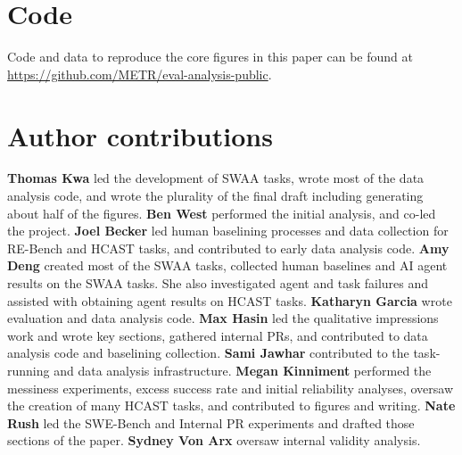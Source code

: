 \documentclass{article}
\newcommand{\gabenchmark}{HCAST}
\begin{document}


\section{Code}

Code and data to reproduce the core figures in this paper can be found at \url{https://github.com/METR/eval-analysis-public}.

\section{Author contributions}


\textbf{Thomas Kwa} led the development of SWAA tasks, wrote most of the data analysis code, and wrote the plurality of the final draft including generating about half of the figures.  \textbf{Ben West} performed the initial analysis, and co-led the project. \textbf{Joel Becker} led human baselining processes and data collection for RE-Bench and \gabenchmark{} tasks, and contributed to early data analysis code. \textbf{Amy Deng} created most of the SWAA tasks, collected human baselines and AI agent results on the SWAA tasks. She also investigated agent and task failures and assisted with obtaining agent results on \gabenchmark{} tasks. \textbf{Katharyn Garcia} wrote evaluation and data analysis code. \textbf{Max Hasin} led the qualitative impressions work and wrote key sections, gathered internal PRs, and contributed to data analysis code and baselining collection. \textbf{Sami Jawhar} contributed to the task-running and data analysis infrastructure. \textbf{Megan Kinniment} performed the messiness experiments, excess success rate and initial reliability analyses, oversaw the creation of many \gabenchmark{} tasks, and contributed to figures and writing. \textbf{Nate Rush} led the SWE-Bench and Internal PR experiments and drafted those sections of the paper. \textbf{Sydney Von Arx} oversaw internal validity analysis.
\end{document}
